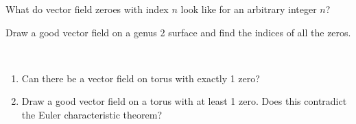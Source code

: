 \begin{exercise}
	What do vector field zeroes with index $n$ look like for an arbitrary integer $n$?\\
\end{exercise}

\begin{exercise}
	Draw a good vector field on a genus 2 surface and find the indices of all the zeros.\\
\end{exercise}

\begin{exercise} $ $
	\begin{enumerate}
		\item Can there be a vector field on torus with exactly 1 zero?
		\item Draw a good vector field on a torus with at least 1 zero. Does this contradict the Euler characteristic theorem?
	\end{enumerate}
\end{exercise}




